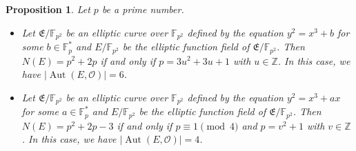\documentclass[journal,12pt,onecolumn]{IEEEtran}
\newtheorem{proposition}{Proposition}
\begin{document}
\begin{proposition}\label{new_ellp_cuv}
    Let \( p \) be a  prime number.
    \begin{itemize}
        \item[(i)] Let \( \mathfrak{E}/\mathbb{F}_{p^2} \) be an elliptic curve over \( \mathbb{F}_{p^2} \) defined by the equation \( y^2 = x^3 + b \) for some \( b \in \mathbb{F}_{p}^* \) and \( E/\mathbb{F}_{p^2} \) be the elliptic function field of \( \mathfrak{E}/\mathbb{F}_{p^2} \). Then \(N(E) = {p^2} + 2p\) if and only if \(p = 3u^2 + 3u + 1\) with \(u\in\mathbb{Z}\). In this case, we have \(|\operatorname{Aut}(E, \mathcal{O})| = 6\). 
        \item[(ii)] Let \( \mathfrak{E}/\mathbb{F}_{p^2} \) be an elliptic curve over \( \mathbb{F}_{p^2} \) defined by the equation \( y^2 = x^3 + ax \) for some \( a \in \mathbb{F}_{p}^* \) and \( E/\mathbb{F}_{p^2} \) be the elliptic function field of \( \mathfrak{E}/\mathbb{F}_{p^2} \). Then \(N(E) = {p^2} + 2p - 3\) if and only if \( p \equiv 1 \pmod{4} \) and \(p = v^2 + 1\) with \(v\in\mathbb{Z}\). In this case, we have \(|\operatorname{Aut}(E, \mathcal{O})| = 4\). 
    \end{itemize}
\end{proposition}
\end{document}
